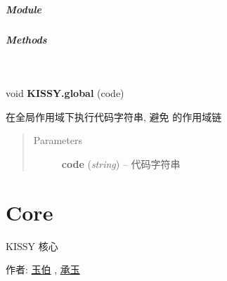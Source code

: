 \documentclass[letterpaper,10pt,english]{sphinxmanual}
\begin{document}
\subparagraph{Module}
\label{api/seed/web/globalEval:module}\begin{quote}

{\hyperref[api/seed/web/index:module-Web]{}}
\end{quote}


\subparagraph{Methods}
\label{api/seed/web/globalEval:methods}

\begin{fulllineitems}
\label{api/seed/web/globalEval:Web.KISSY.globalEval}~
\begin{DUlineblock}{0em}
\item[] void \textbf{KISSY.global} (code)
\item[] 在全局作用域下执行代码字符串, 避免  的作用域链
\end{DUlineblock}
\begin{quote}\begin{description}
\item[{Parameters}] \leavevmode
\textbf{code} (\emph{string}) -- 代码字符串

\end{description}\end{quote}

\end{fulllineitems}



\section{Core}
\label{api/core/index:core}\label{api/core/index::doc}\label{api/core/index:id1}
\begin{DUlineblock}{0em}
\item[] KISSY 核心
\item[] 作者: \href{mailto:lifesinger@gmail.com}{玉伯} , \href{mailto:yiminghe@gmail.com}{承玉}
\end{DUlineblock}
\label{api/core/ua/index:module-UA}
\end{document}
